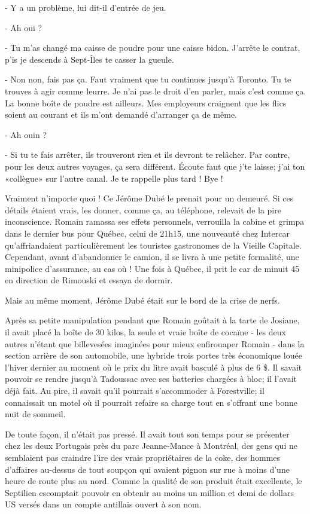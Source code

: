 - Y a un problème, lui dit-il d’entrée de jeu.

- Ah oui ?

- Tu m’as changé ma caisse de poudre pour une caisse bidon. J’arrête le contrat, p’is je descends à Sept-Îles te casser la gueule.

- Non non, fais pas ça. Faut vraiment que tu continues jusqu’à Toronto. Tu te trouves à agir comme leurre. Je n’ai pas le droit d’en parler, mais c’est comme ça. La bonne boîte de poudre est ailleurs. Mes employeurs craignent que les flics soient au courant et ils m’ont demandé d’arranger ça de même.

- Ah ouin ?

- Si tu te fais arrêter, ils trouveront rien et ils devront te relâcher. Par contre, pour les deux autres voyages, ça sera différent. Écoute faut que j’te laisse; j’ai ton «collègue» sur l’autre canal. Je te rappelle plus tard ! Bye !

Vraiment n’importe quoi ! Ce Jérôme Dubé le prenait pour un demeuré. Si ces détails étaient vrais, les donner, comme ça, au téléphone, relevait de la pire inconscience. Romain ramassa ses effets personnels, verrouilla la cabine et grimpa dans le dernier bus pour Québec, celui de 21h15, une nouveauté chez Intercar qu’affriandaient particulièrement les touristes gastronomes de la Vieille Capitale. Cependant, avant d’abandonner le camion, il se livra à une petite formalité, une minipolice d’assurance, au cas où !
Une fois à Québec, il prit le car de minuit 45 en direction de Rimouski et essaya de dormir.

Mais au même moment, Jérôme Dubé était sur le bord de la crise de nerfs.

Après sa petite manipulation pendant que Romain goûtait à la tarte de Josiane, il avait placé la boîte de 30 kilos, la seule et vraie boîte de cocaïne - les deux autres n’étant que billevesées imaginées pour mieux enfirouaper Romain - dans la section arrière de son automobile, une hybride trois portes très économique louée l’hiver dernier au moment où le prix du litre avait basculé à plus de 6 \$. Il savait pouvoir se rendre jusqu’à Tadoussac avec ses batteries chargées à bloc; il l’avait déjà fait. Au pire, il savait qu’il pourrait s’accommoder à Forestville; il connaissait un motel où il pourrait refaire sa charge tout en s’offrant une bonne nuit de sommeil.

De toute façon, il n’était pas pressé. Il avait tout son temps pour se présenter chez les deux Portugais près du parc Jeanne-Mance à Montréal, des gens qui ne semblaient pas craindre l’ire des vrais propriétaires de la coke, des hommes d’affaires au-dessus de tout soupçon qui avaient pignon sur rue à moins d’une heure de route plus au nord. Comme la qualité de son produit était excellente, le Septilien escomptait pouvoir en obtenir au moins un million et demi de dollars US versés dans un compte antillais ouvert à son nom.

